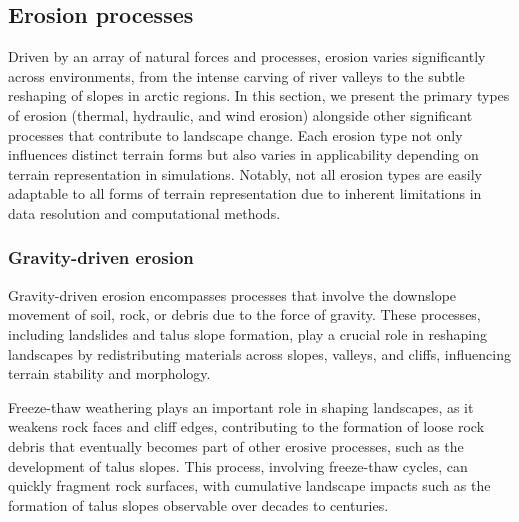 
\subsection{Erosion processes}
Driven by an array of natural forces and processes, erosion varies significantly across environments, from the intense carving of river valleys to the subtle reshaping of slopes in arctic regions. In this section, we present the primary types of erosion (thermal, hydraulic, and wind erosion) alongside other significant processes that contribute to landscape change.  
Each erosion type not only influences distinct terrain forms but also varies in applicability depending on terrain representation in simulations. Notably, not all erosion types are easily adaptable to all forms of terrain representation due to inherent limitations in data resolution and computational methods.

\subsubsection{Gravity-driven erosion}
Gravity-driven erosion encompasses processes that involve the downslope movement of soil, rock, or debris due to the force of gravity. These processes, including landslides and talus slope formation, play a crucial role in reshaping landscapes by redistributing materials across slopes, valleys, and cliffs, influencing terrain stability and morphology.



Freeze-thaw weathering plays an important role in shaping landscapes, as it weakens rock faces and cliff edges, contributing to the formation of loose rock debris that eventually becomes part of other erosive processes, such as the development of talus slopes. This process, involving freeze-thaw cycles, can quickly fragment rock surfaces, with cumulative landscape impacts such as the formation of talus slopes observable over decades to centuries.

